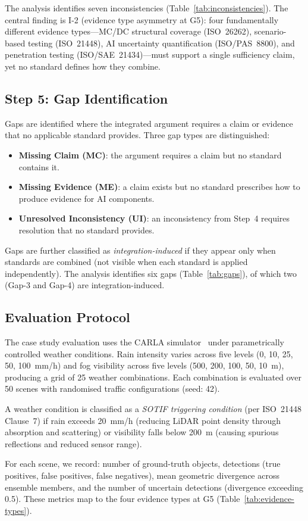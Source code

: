 The analysis identifies seven inconsistencies (Table~\ref{tab:inconsistencies}).
The central finding is I-2 (evidence type asymmetry at G5): four fundamentally
different evidence types---MC/DC structural coverage (ISO~26262), scenario-based
testing (ISO~21448), AI uncertainty quantification (ISO/PAS~8800), and
penetration testing (ISO/SAE~21434)---must support a single sufficiency
claim, yet no standard defines how they combine.

\subsection{Step 5: Gap Identification}\label{sec:step5}

Gaps are identified where the integrated argument requires a claim or
evidence that no applicable standard provides. Three gap types are
distinguished:
\begin{itemize}
    \item \textbf{Missing Claim (MC)}: the argument requires a claim
          but no standard contains it.
    \item \textbf{Missing Evidence (ME)}: a claim exists but no standard
          prescribes how to produce evidence for AI components.
    \item \textbf{Unresolved Inconsistency (UI)}: an inconsistency from
          Step~4 requires resolution that no standard provides.
\end{itemize}

Gaps are further classified as \emph{integration-induced} if they appear
only when standards are combined (not visible when each standard is applied
independently). The analysis identifies six gaps (Table~\ref{tab:gaps}),
of which two (Gap-3 and Gap-4) are integration-induced.

\subsection{Evaluation Protocol}\label{sec:evaluation}

The case study evaluation uses the CARLA simulator~\cite{Dosovitskiy2017}
under parametrically controlled weather conditions. Rain intensity varies
across five levels (0, 10, 25, 50, 100~mm/h) and fog visibility across
five levels (500, 200, 100, 50, 10~m), producing a grid of 25 weather
combinations. Each combination is evaluated over 50 scenes with randomised
traffic configurations (seed: 42).

A weather condition is classified as a \emph{SOTIF triggering condition}
(per ISO~21448 Clause~7) if rain exceeds 20~mm/h (reducing LiDAR point
density through absorption and scattering) or visibility falls below 200~m
(causing spurious reflections and reduced sensor range).

For each scene, we record: number of ground-truth objects, detections
(true positives, false positives, false negatives), mean geometric
divergence across ensemble members, and the number of uncertain detections
(divergence exceeding 0.5). These metrics map to the four evidence types
at G5 (Table~\ref{tab:evidence-types}).
